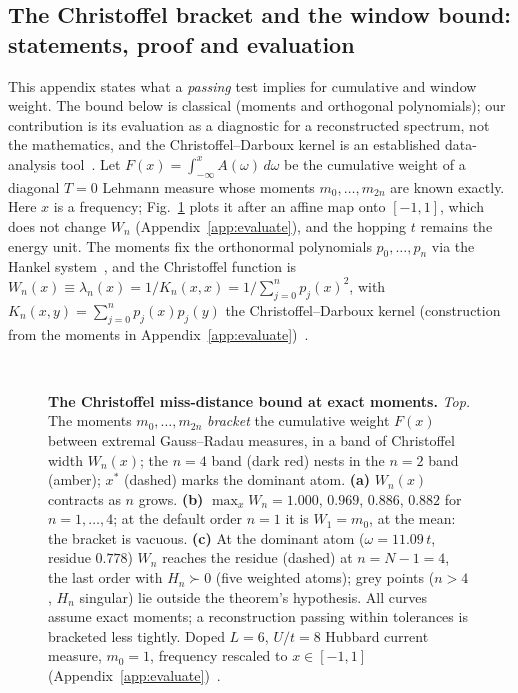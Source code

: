 \documentclass[submission, PhysCore]{SciPost}
\begin{document}
\begin{appendix}
\section{The Christoffel bracket and the window bound: statements, proof and evaluation}
\label{app:proof}
\newtheorem{applemma}{Lemma}%
This appendix states what a \emph{passing} test implies for cumulative and window weight. The bound below is classical (moments and orthogonal polynomials); our contribution is its evaluation as a diagnostic for a reconstructed spectrum, not the mathematics, and the Christoffel--Darboux kernel is an established data-analysis tool~\cite{GM2010,Szego1975,PauwelsLasserre2019,LasserrePauwelsPutinar2022}. Let $F(x)=\int_{-\infty}^{x}A(\omega)\,d\omega$ be the cumulative weight of a diagonal $T=0$ Lehmann measure whose moments $m_0,\dots,m_{2n}$ are known exactly. Here $x$ is a frequency; Fig.~\ref{fig:christoffel} plots it after an affine map onto $[-1,1]$, which does not change $W_n$ (Appendix~\ref{app:evaluate}), and the hopping $t$ remains the energy unit. The moments fix the orthonormal polynomials $p_0,\dots,p_n$ via the Hankel system~\cite{ShohatTamarkin1943}, and the Christoffel function is $W_n(x)\equiv\lambda_n(x)=1/K_n(x,x)=1/\sum_{j=0}^{n}p_j(x)^2$, with $K_n(x,y)=\sum_{j=0}^{n}p_j(x)p_j(y)$ the Christoffel--Darboux kernel (construction from the moments in Appendix~\ref{app:evaluate})~\cite{Szego1975,GM2010}.

\begin{figure}[t]
\centering
{}\\[6pt]
\caption{\textbf{The Christoffel miss-distance bound at exact moments.} \emph{Top.} The moments $m_0,\dots,m_{2n}$ \emph{bracket} the cumulative weight $F(x)$ between extremal Gauss--Radau measures, in a band of Christoffel width $W_n(x)$; the $n{=}4$ band (dark red) nests in the $n{=}2$ band (amber); $x^{*}$ (dashed) marks the dominant atom. \textbf{(a)} $W_n(x)$ contracts as $n$ grows. \textbf{(b)} $\max_xW_n=1.000$, $0.969$, $0.886$, $0.882$ for $n=1,\dots,4$; at the default order $n=1$ it is $W_1=m_0$, at the mean: the bracket is vacuous. \textbf{(c)} At the dominant atom ($\omega=11.09\,t$, residue $0.778$) $W_n$ reaches the residue (dashed) at $n=N-1=4$, the last order with $H_n\succ0$ (five weighted atoms); grey points ($n>4$, $H_n$ singular) lie outside the theorem's hypothesis. All curves assume exact moments; a reconstruction passing within tolerances is bracketed less tightly. Doped $L=6$, $U/t=8$ Hubbard current measure, $m_0=1$, frequency rescaled to $x\in[-1,1]$ (Appendix~\ref{app:evaluate})~\cite{GM2010,ShohatTamarkin1943,Akhiezer1965,Totik2000,MNT1991,Szego1975}.}
\label{fig:bracketing}
\label{fig:christoffel}
\end{figure}


\end{appendix}
\end{document}
